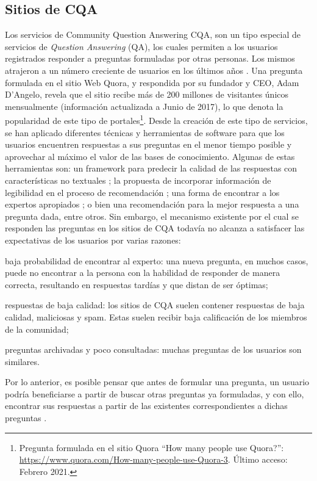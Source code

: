 \subsection{Sitios de CQA}
Los servicios de Community Question Answering CQA, son un tipo especial de servicios de \textit{Question Answering} (QA), los cuales permiten a los usuarios registrados responder a preguntas formuladas por otras personas. Los mismos atrajeron a un número creciente de usuarios en los últimos años \citep{li2010routing}. Una pregunta formulada en el sitio Web Quora, y respondida por su fundador y CEO, Adam D'Angelo, revela que el sitio recibe más de 200 millones de visitantes únicos mensualmente (información actualizada a Junio de 2017), lo que denota la popularidad de este tipo de portales\footnote{Pregunta formulada en el sitio Quora “How many people use Quora?”: \url{https://www.quora.com/How-many-people-use-Quora-3}. Último acceso: Febrero 2021.}. Desde la creación de este tipo de servicios, se han aplicado diferentes técnicas y herramientas de software para que los usuarios encuentren respuestas a sus preguntas en el menor tiempo posible y aprovechar al máximo el valor de las bases de conocimiento. Algunas de estas herramientas son: un framework para predecir la calidad de las respuestas con características no textuales \citep{jeon2006framework}; la propuesta de incorporar información de legibilidad en el proceso de recomendación \citep{anuyah2017can}; una forma de encontrar a los expertos apropiados \citep{li2010routing}; o bien una recomendación para la mejor respuesta a una pregunta dada, entre otros. Sin embargo, el mecanismo existente por el cual se responden las preguntas en los sitios de CQA todavía no alcanza a satisfacer las expectativas de los usuarios por varias razones: \begin{enumerate*} [label=(\roman*)] \item baja probabilidad de encontrar al experto: una nueva pregunta, en muchos casos, puede no encontrar a la persona con la habilidad de responder de manera correcta, resultando en respuestas tardías y que distan de ser óptimas; \item respuestas de baja calidad: los sitios de CQA suelen contener respuestas de baja calidad, maliciosas y spam. Estas suelen recibir baja calificación de los miembros de la comunidad; \item preguntas archivadas y poco consultadas: muchas preguntas de los usuarios son similares.\end{enumerate*} Por lo anterior, es posible pensar que antes de formular una pregunta, un usuario podría beneficiarse a partir de buscar otras preguntas ya formuladas, y con ello, encontrar sus respuestas a partir de las existentes correspondientes a dichas preguntas \citep{yang2013cqarank}.

